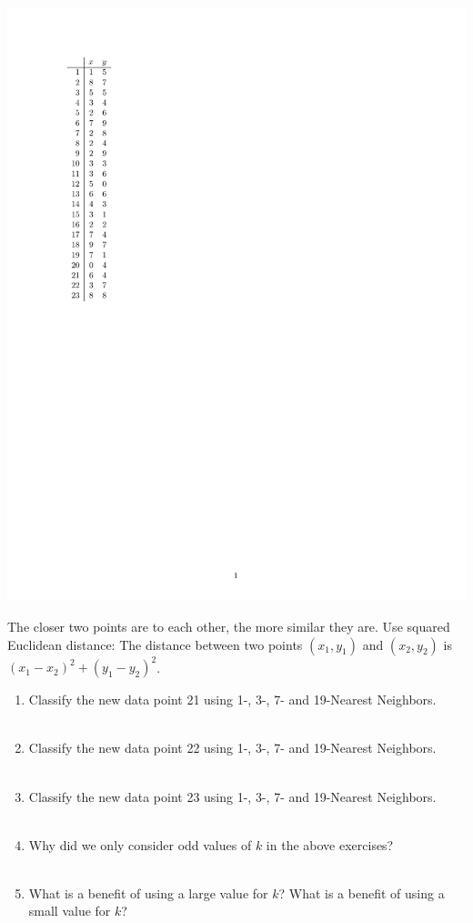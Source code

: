 \documentclass[11pt]{article}
\begin{document}
\begin{center}
\includegraphics[scale = 0.9]{table.pdf}
\end{center}
The closer two points are to each other, the more similar they are. Use squared Euclidean distance: The distance between two points $(x_1, y_1)$ and $(x_2, y_2)$ is $(x_1 - x_2)^2 + (y_1 - y_2)^2$.
\begin{enumerate}
\item Classify the new data point 21 using 1-, 3-, 7- and 19-Nearest Neighbors.\\~\\
\item Classify the new data point 22 using 1-, 3-, 7- and 19-Nearest Neighbors.\\~\\
\item Classify the new data point 23 using 1-, 3-, 7- and 19-Nearest Neighbors.\\~\\
\item Why did we only consider odd values of $k$ in the above exercises?\\~\\
\item What is a benefit of using a large value for $k$? What is a benefit of using a small value for $k$?
\end{enumerate}
\end{document}
